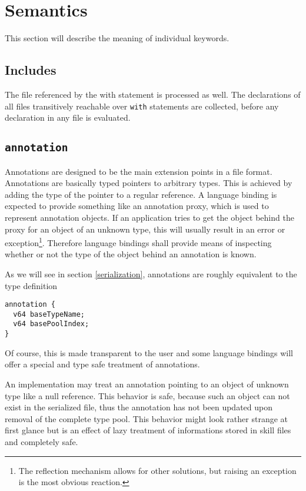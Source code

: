 
\section{Semantics}

This section will describe the meaning of individual keywords.

\subsection{Includes}
The file referenced by the with statement is processed as well. The declarations of all files transitively reachable over \texttt{with} statements are collected, before any declaration in any file is evaluated.

\subsection{\texttt{annotation}}
Annotations are designed to be the main extension points in a file format. Annotations are basically typed pointers to arbitrary types. This is achieved by adding the type of the pointer to a regular reference. A language binding is expected to provide something like an annotation proxy, which is used to represent annotation objects. If an application tries to get the object behind the proxy for an object of an unknown type, this will usually result in an error or exception\footnote{The reflection mechanism allows for other solutions, but raising an exception is the most obvious reaction.}. Therefore language bindings shall provide means of inspecting whether or not the type of the object behind an annotation is known.

As we will see in section \ref{serialization}, annotations are roughly equivalent to the type definition
\begin{verbatim}
annotation {
  v64 baseTypeName;
  v64 basePoolIndex;
}
\end{verbatim}
Of course, this is made transparent to the user and some language bindings will offer a special and type safe treatment of annotations.

An implementation may treat an annotation pointing to an object of unknown type like a null reference. This behavior is safe, because such an object can not exist in the serialized file, thus the annotation has not been updated upon removal of the complete type pool. This behavior might look rather strange at first glance but is an effect of lazy treatment of informations stored in skill files and completely safe.


